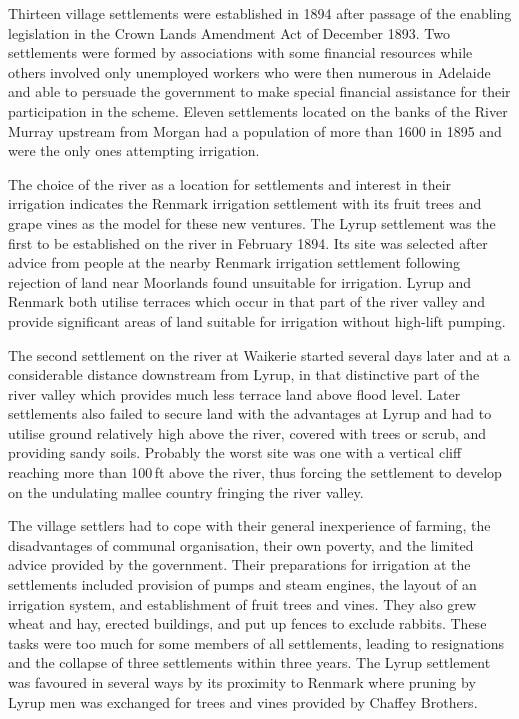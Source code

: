 Thirteen village settlements were established in 1894 after passage of
the enabling legislation in the Crown Lands Amendment Act of December
1893.  Two settlements were formed by associations with some financial
resources while others involved only unemployed workers who were then
numerous in Adelaide and able to persuade the government to make
special financial assistance for their participation in the scheme.
Eleven settlements located on the banks of the River Murray upstream
from Morgan had a population of more than 1600 in 1895 and were the
only ones attempting irrigation.

The choice of the river as a location for settlements and interest in
their irrigation indicates the Renmark irrigation settlement with its
fruit trees and grape vines as the model for these new ventures.  The
Lyrup settlement was the first to be established on the river in
February 1894.  Its site was selected after advice from people at the
nearby Renmark irrigation settlement following rejection of land near
Moorlands found unsuitable for irrigation.  Lyrup and Renmark both
utilise terraces which occur in that part of the river valley and
provide significant areas of land suitable for irrigation without
high-lift pumping.

The second settlement on the river at Waikerie started several days
later and at a considerable distance downstream from Lyrup, in that
distinctive part of the river valley which provides much less terrace
land above flood level.  Later settlements also failed to secure land
with the advantages at Lyrup and had to utilise ground relatively high
above the river, covered with trees or scrub, and providing sandy
soils.  Probably the worst site was one with a vertical cliff reaching
more than 100\,ft above the river, thus forcing the settlement to
develop on the undulating mallee country fringing the river valley.

The village settlers had to cope with their general inexperience of
farming, the disadvantages of communal organisation, their own
poverty, and the limited advice provided by the government.  Their
preparations for irrigation at the settlements included provision of
pumps and steam engines, the layout of an irrigation system, and
establishment of fruit trees and vines.  They also grew wheat and hay,
erected buildings, and put up fences to exclude rabbits.  These tasks
were too much for some members of all settlements, leading to
resignations and the collapse of three settlements within three years.
The Lyrup settlement was favoured in several ways by its proximity to
Renmark where pruning by Lyrup men was exchanged for trees and vines
provided by Chaffey Brothers.

